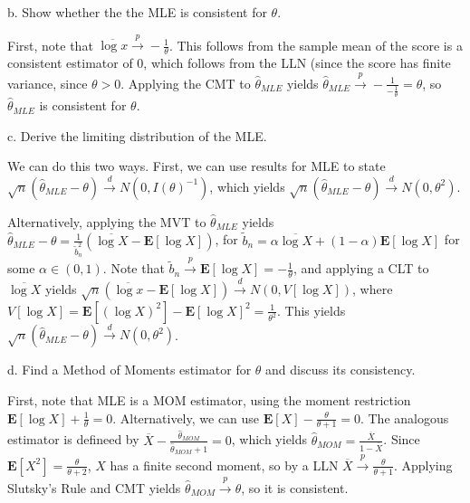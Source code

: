 \documentclass[12pt,english]{article}
\begin{document}
\vspace{1em}
b. Show whether the the MLE is consistent for $\theta$.
\vspace{1em}

First, note that $\overline{\log x} \overset{p}{\to} -\frac{1}{\theta}$. This follows from the sample mean of the score is a consistent estimator of 0, which follows from the LLN (since the score has finite variance, since $\theta > 0$. Applying the CMT to  $\hat{\theta}_{MLE}$ yields $\hat{\theta}_{MLE} \overset{p}{\to} -\frac{1}{-\frac{1}{\theta}} = \theta$, so $\hat{\theta}_{MLE}$ is consistent for $\theta$.

\vspace{1em}
c. Derive the limiting distribution of the MLE.
\vspace{1em}

We can do this two ways. First, we can use results for MLE to state $\sqrt{n}(\hat{\theta}_{MLE} - \theta) \overset{d}{\to} N(0, I(\theta)^{-1})$, which yields $\sqrt{n}(\hat{\theta}_{MLE} - \theta) \overset{d}{\to} N(0, \theta^{2})$.

Alternatively, applying the MVT to $\hat{\theta}_{MLE}$ yields $\hat{\theta}_{MLE} - \theta = \frac{1}{\tilde{b}_{n}^{2}}(\overline{\log X} - \mathbf{E}[\log X])$, for $\tilde{b}_{n} = \alpha \overline{\log X} + (1 - \alpha) \mathbf{E}[\log X]$ for some $\alpha \in (0, 1)$. Note that $\tilde{b}_{n} \overset{p}{\to} \mathbf{E}[\log X] = -\frac{1}{\theta}$, and applying a CLT to $\overline{\log X}$ yields $\sqrt{n}(\overline{\log x} - \mathbf{E}[\log X]) \overset{d}{\to} N(0, V[\log X])$, where $V[\log X] = \mathbf{E}[(\log X)^{2}] - \mathbf{E}[\log X]^{2} = \frac{1}{\theta^{2}}$. This yields $\sqrt{n}(\hat{\theta}_{MLE} - \theta) \overset{d}{\to} N(0, \theta^{2})$.

\vspace{1em}
d. Find a Method of Moments estimator for $\theta$ and discuss its
consistency.
\vspace{1em}

First, note that MLE is a MOM estimator, using the moment restriction $\mathbf{E}[\log X] + \frac{1}{\theta} = 0$. Alternatively, we can use $\mathbf{E}[X] - \frac{\theta}{\theta + 1} = 0$. The analogous estimator is defineed by $\overline{X} - \frac{\hat{\theta}_{MOM}}{\hat{\theta}_{MOM} + 1} = 0$, which yields $\hat{\theta}_{MOM} = \frac{\overline{X}}{1 - \overline{X}}$. Since $\mathbf{E}[X^{2}] = \frac{\theta}{\theta + 2}$, $X$ has a finite second moment, so by a LLN $\overline{X} \overset{p}{\to} \frac{\theta}{\theta + 1}$. Applying Slutsky's Rule and CMT yields $\hat{\theta}_{MOM} \overset{p}{\to} \theta$, so it is consistent.
\end{document}
